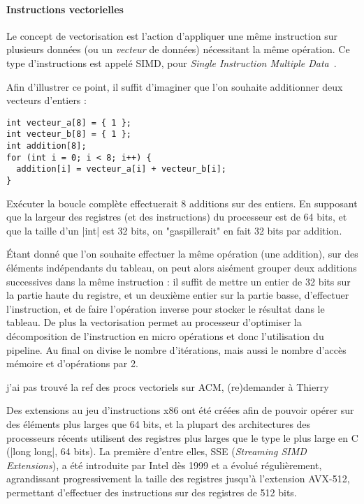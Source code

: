 \paragraph{Instructions vectorielles}\label{sec:context:numa:simd}

Le concept de vectorisation est l'action d'appliquer une même instruction sur plusieurs données (ou un \emph{vecteur} de données) nécessitant la même opération.
Ce type d'instructions est appelé SIMD, pour \emph{Single Instruction Multiple Data}~\cite{Flynn1966}.

Afin d'illustrer ce point, il suffit d'imaginer que l'on souhaite additionner deux vecteurs d'entiers :
\begin{lstlisting}
int vecteur_a[8] = { 1 };
int vecteur_b[8] = { 1 };
int addition[8];
for (int i = 0; i < 8; i++) {
  addition[i] = vecteur_a[i] + vecteur_b[i];
}
\end{lstlisting}

Exécuter la boucle complète effectuerait 8 additions sur des entiers.
En supposant que la largeur des registres (et des instructions) du processeur est de 64 bits, et que la taille d'un |int| est 32 bits, on "gaspillerait" en fait 32 bits par addition.

Étant donné que l'on souhaite effectuer la même opération (une addition), sur des éléments indépendants du tableau, on peut alors aisément grouper deux additions successives dans la même instruction : il suffit de mettre un entier de 32 bits sur la partie haute du registre, et un deuxième entier sur la partie basse, d'effectuer l'instruction, et de faire l'opération inverse pour stocker le résultat dans le tableau.
De plus la vectorisation permet au processeur d'optimiser la décomposition de l'instruction en micro opérations et donc l'utilisation du pipeline.
Au final on divise le nombre d'itérations, mais aussi le nombre d'accès mémoire et d'opérations par 2.


\begin{todo}
  j'ai pas trouvé la ref des procs vectoriels sur ACM, (re)demander à Thierry
\end{todo}

Des extensions au jeu d'instructions x86 ont été créées afin de pouvoir opérer sur des éléments plus larges que 64 bits, et la plupart des architectures des processeurs récents utilisent des registres plus larges que le type le plus large en C (|long long|, 64 bits).
La première d'entre elles, SSE (\emph{Streaming SIMD Extensions}), a été introduite par Intel dès 1999 et a évolué régulièrement, agrandissant progressivement la taille des registres jusqu'à l'extension AVX-512, permettant d'effectuer des instructions sur des registres de 512 bits.

